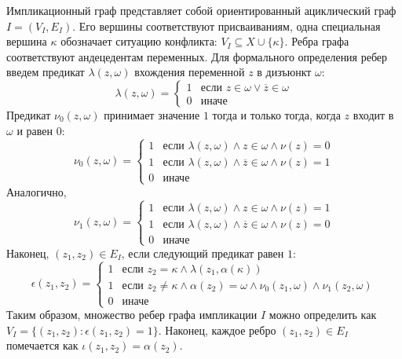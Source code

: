 Импликационный граф представляет собой ориентированный ациклический граф $I = \left(V_I, E_I \right)$. 
Его вершины соответствуют присваиваниям, одна специальная вершина $\kappa$ обозначает ситуацию конфликта: $V_I \subseteq X \cup \{ \kappa \} $.
Ребра графа соответствуют андецедентам переменных. 
Для формального определения ребер введем предикат $\lambda(z, \omega)$ вхождения переменной $z$ в дизъюнкт $\omega$:
\begin{equation*}
\lambda(z, \omega) = 
\begin{cases}
1 & \text{если } z \in \omega \lor \overline{z} \in \omega \\
0 & \text{иначе}
\end{cases}
\end{equation*}
Предикат $\nu_0(z, \omega)$ принимает значение $1$ тогда и только тогда, когда $z$ входит в $\omega$ и равен $0$:
\begin{equation*}
\nu_0(z, \omega) = 
\begin{cases}
1 & \text{если } \lambda(z, \omega) \land z \in \omega \land \nu(z) = 0 \\
1 & \text{если } \lambda(z, \omega) \land \overline{z} \in \omega \land \nu(z) = 1 \\
0 & \text{иначе}
\end{cases}
\end{equation*}
Аналогично,
\begin{equation*}
\nu_1(z, \omega) = 
\begin{cases}
1 & \text{если } \lambda(z, \omega) \land z \in \omega \land \nu(z) = 1 \\
1 & \text{если } \lambda(z, \omega) \land \overline{z} \in \omega \land \nu(z) = 0 \\
0 & \text{иначе}
\end{cases}
\end{equation*}
Наконец, $(z_1, z_2) \in E_I$, если следующий предикат равен $1$:
\begin{equation*}
\epsilon(z_1, z_2) = 
\begin{cases}
1 & \text{если } z_2 = \kappa \land \lambda(z_1, \alpha(\kappa)) \\
1 & \text{если } z_2 \ne \kappa \land \alpha(z_2)=\omega \land \nu_0(z_1, \omega) \land \nu_1(z_2, \omega) \\
0 & \text{иначе}
\end{cases}
\end{equation*}
Таким образом, множество ребер графа импликации $I$ можно определить как $V_I = \{ (z_1, z_2): \epsilon(z_1, z_2) = 1\}$. Наконец, каждое ребро $(z_1, z_2) \in E_I$ помечается как $\iota(z_1, z_2) = \alpha(z_2)$.

